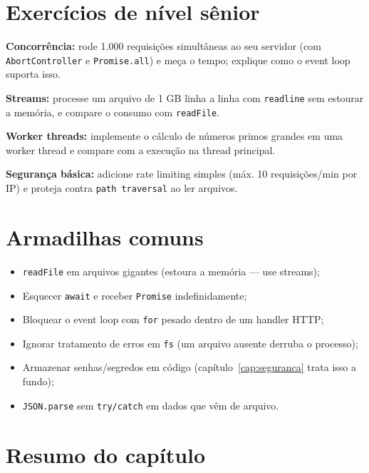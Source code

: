 \section{Exercícios de nível sênior}

\begin{seniores}
  \item \textbf{Concorrência:} rode 1.000 requisições simultâneas ao seu servidor (com \texttt{AbortController} e \texttt{Promise.all}) e meça o tempo; explique como o event loop suporta isso.
  \item \textbf{Streams:} processe um arquivo de 1 GB linha a linha com \texttt{readline} sem estourar a memória, e compare o consumo com \texttt{readFile}.
  \item \textbf{Worker threads:} implemente o cálculo de números primos grandes em uma worker thread e compare com a execução na thread principal.
  \item \textbf{Segurança básica:} adicione rate limiting simples (máx. 10 requisições/min por IP) e proteja contra \texttt{path traversal} ao ler arquivos.
\end{seniores}

\section{Armadilhas comuns}

\begin{itemize}[leftmargin=*, itemsep=0.4em]
  \item \texttt{readFile} em arquivos gigantes (estoura a memória — use streams);
  \item Esquecer \texttt{await} e receber \texttt{Promise} indefinidamente;
  \item Bloquear o event loop com \texttt{for} pesado dentro de um handler HTTP;
  \item Ignorar tratamento de erros em \texttt{fs} (um arquivo ausente derruba o processo);
  \item Armazenar senhas/segredos em código (capítulo~\ref{cap:seguranca} trata isso a fundo);
  \item \texttt{JSON.parse} sem \texttt{try/catch} em dados que vêm de arquivo.
\end{itemize}

\section{Resumo do capítulo}

